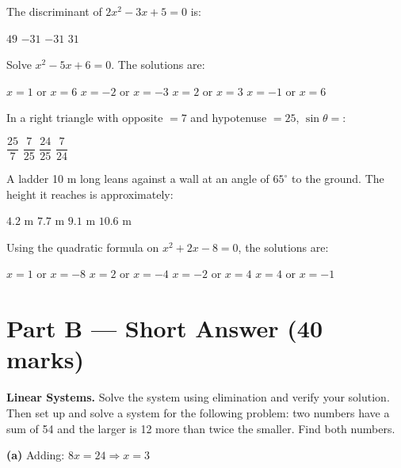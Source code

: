 \documentclass[addpoints]{exam}
\begin{document}
\begin{questions}
\question[1] The discriminant of $2x^2 - 3x + 5 = 0$ is:
\begin{choices}
    \choice $49$
    \choice $-31$
    \correctchoice $-31$
    \choice $31$
\end{choices}

\question[1] Solve $x^2 - 5x + 6 = 0$. The solutions are:
\begin{choices}
    \choice $x = 1$ or $x = 6$
    \choice $x = -2$ or $x = -3$
    \correctchoice $x = 2$ or $x = 3$
    \choice $x = -1$ or $x = 6$
\end{choices}

\question[1] In a right triangle with opposite $= 7$ and hypotenuse $= 25$, $\sin\theta =$:
\begin{choices}
    \choice $\dfrac{25}{7}$
    \correctchoice $\dfrac{7}{25}$
    \choice $\dfrac{24}{25}$
    \choice $\dfrac{7}{24}$
\end{choices}

\question[1] A ladder 10 m long leans against a wall at an angle of $65^\circ$ to the ground.
The height it reaches is approximately:
\begin{choices}
    \choice $4.2$ m
    \choice $7.7$ m
    \correctchoice $9.1$ m
    \choice $10.6$ m
\end{choices}

\question[1] Using the quadratic formula on $x^2 + 2x - 8 = 0$, the solutions are:
\begin{choices}
    \choice $x = 1$ or $x = -8$
    \correctchoice $x = 2$ or $x = -4$
    \choice $x = -2$ or $x = 4$
    \choice $x = 4$ or $x = -1$
\end{choices}


\section*{Part B --- Short Answer (40 marks)}

\question[8] \textbf{Linear Systems.} Solve the system using elimination and verify your solution.
Then set up and solve a system for the following problem: two numbers have a sum of 54 and the
larger is 12 more than twice the smaller. Find both numbers.
\begin{solution}[10cm]
\textbf{(a)} Adding: $8x = 24 \Rightarrow x = 3$


\end{solution}
\end{questions}
\end{document}
